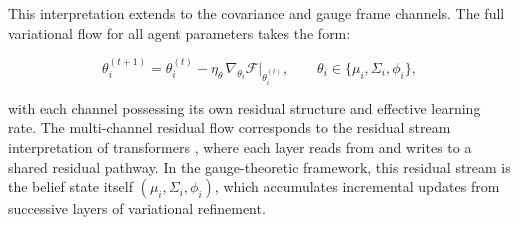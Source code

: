 \documentclass[twoside,11pt]{article}
\begin{document}
This interpretation extends to the covariance and gauge frame channels. The full variational flow for all agent parameters takes the form:

\begin{equation}
\theta_i^{(t+1)} = \theta_i^{(t)} - \eta_\theta \,\nabla_{\theta_i}\mathcal{F}\bigg|_{\theta_i^{(t)}}, \qquad \theta_i \in \{\mu_i, \Sigma_i, \phi_i\},
\end{equation}

with each channel possessing its own residual structure and effective learning rate. The multi-channel residual flow corresponds to the residual stream interpretation of transformers \citep{elhage2021mathematical}, where each layer reads from and writes to a shared residual pathway. In the gauge-theoretic framework, this residual stream is the belief state itself $(\mu_i, \Sigma_i, \phi_i)$, which accumulates incremental updates from successive layers of variational refinement.
\end{document}
